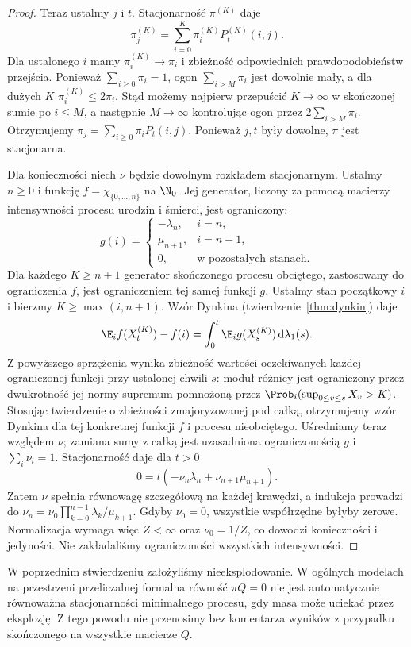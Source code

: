 \begin{proof}
Teraz ustalmy $j$ i $t$. Stacjonarność $\pi^{(K)}$ daje
\[
\pi_j^{(K)}=\sum_{i=0}^K\pi_i^{(K)}P_t^{(K)}(i,j).
\]
Dla ustalonego $i$ mamy $\pi_i^{(K)}\to\pi_i$
i zbieżność odpowiednich prawdopodobieństw przejścia.
Ponieważ $\sum_{i\ge0}\pi_i=1$, ogon
$\sum_{i>M}\pi_i$ jest dowolnie mały, a dla dużych $K$
$\pi_i^{(K)}\le2\pi_i$. Stąd możemy najpierw przepuścić
$K\to\infty$ w skończonej sumie po $i\le M$,
a następnie $M\to\infty$ kontrolując ogon przez
$2\sum_{i>M}\pi_i$. Otrzymujemy
$\pi_j=\sum_{i\ge0}\pi_iP_t(i,j)$.
Ponieważ $j,t$ były dowolne, $\pi$ jest stacjonarna.

Dla konieczności niech $\nu$ będzie dowolnym rozkładem
stacjonarnym. Ustalmy $n\ge0$ i funkcję
$f=\chi_{\{0,\ldots,n\}}$ na $\N_0$.
Jej generator, liczony za pomocą macierzy intensywności
procesu urodzin i śmierci, jest ograniczony:
\[
g(i)=
\begin{cases}
-\lambda_n,&i=n,\\
\mu_{n+1},&i=n+1,\\
0,&\text{w pozostałych stanach}.
\end{cases}
\]
Dla każdego $K\ge n+1$ generator skończonego procesu
obciętego, zastosowany do ograniczenia $f$, jest
ograniczeniem tej samej funkcji $g$. Ustalmy stan
początkowy $i$ i bierzmy $K\ge\max(i,n+1)$.
Wzór Dynkina (twierdzenie~\ref{thm:dynkin}) daje
\[
\E_i f(X_t^{(K)})-f(i)
=\int_0^t\E_i g(X_s^{(K)})\,\mathrm d\lambda_1(s).
\]
Z powyższego sprzężenia wynika zbieżność wartości
oczekiwanych każdej ograniczonej funkcji przy ustalonej
chwili $s$: moduł różnicy jest ograniczony przez
dwukrotność jej normy supremum pomnożoną przez
$\Prob_i(\sup_{0\le v\le s}X_v>K)$.
Stosując twierdzenie o zbieżności zmajoryzowanej
pod całką, otrzymujemy wzór Dynkina dla tej konkretnej
funkcji $f$ i procesu nieobciętego.
Uśredniamy teraz względem $\nu$; zamiana sumy z całką
jest uzasadniona ograniczonością $g$ i $\sum_i\nu_i=1$.
Stacjonarność daje dla $t>0$
\[
0=t(-\nu_n\lambda_n+\nu_{n+1}\mu_{n+1}).
\]
Zatem $\nu$ spełnia równowagę szczegółową na każdej
krawędzi, a indukcja prowadzi do
$\nu_n=\nu_0\prod_{k=0}^{n-1}\lambda_k/\mu_{k+1}$.
Gdyby $\nu_0=0$, wszystkie współrzędne byłyby zerowe.
Normalizacja wymaga więc $Z<\infty$ oraz $\nu_0=1/Z$,
co dowodzi konieczności i jedyności. Nie zakładaliśmy
ograniczoności wszystkich intensywności.
\end{proof}

\begin{uwaga}
W poprzednim stwierdzeniu założyliśmy nieeksplodowanie.
W ogólnych modelach na przestrzeni przeliczalnej
formalna równość $\pi Q=0$ nie jest automatycznie
równoważna stacjonarności minimalnego procesu,
gdy masa może uciekać przez eksplozję. Z tego powodu
nie przenosimy bez komentarza wyników z przypadku
skończonego na wszystkie macierze $Q$.
\end{uwaga}


